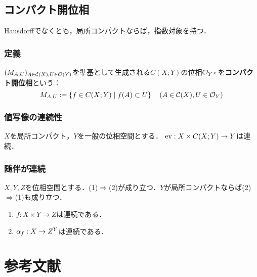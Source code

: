 \documentclass[uplatex,dvipdfmx]{jsreport}
\begin{document}
\section{コンパクト開位相}

\begin{tcolorbox}[colframe=ForestGreen, colback=ForestGreen!10!white,breakable,colbacktitle=ForestGreen!40!white,coltitle=black,fonttitle=\bfseries\sffamily,
title=]
    Hausdorffでなくとも，局所コンパクトならば，指数対象を持つ．
\end{tcolorbox}

\subsection{定義}

\begin{definition}
    $(M_{A,U})_{A\in\mathcal{C}(X),U\in\mathcal{O}(Y)}$を準基として生成される$C(X;Y)$の位相$\mathcal{O}_{Y^X}$を\textbf{コンパクト開位相}という：
    \[M_{A,U}:=\left\{f\in C(X;Y)\mid f(A)\subset U\right\}\quad(A\in\mathcal{C}(X),U\in\mathcal{O}_Y)\]
\end{definition}

\subsection{値写像の連続性}

\begin{proposition}
    $X$を局所コンパクト，$Y$を一般の位相空間とする．
    $\mathrm{ev}:X\times C(X;Y)\to Y$は連続．
\end{proposition}

\subsection{随伴が連続}

\begin{proposition}
    $X,Y,Z$を位相空間とする．(1)$\Rightarrow$(2)が成り立つ．$Y$が局所コンパクトならば(2)$\Rightarrow$(1)も成り立つ．
    \begin{enumerate}
        \item $f:X\times Y\to Z$は連続である．
        \item $\alpha_f:X\to Z^Y$は連続である．
    \end{enumerate}
\end{proposition}

\chapter{参考文献}
\end{document}
